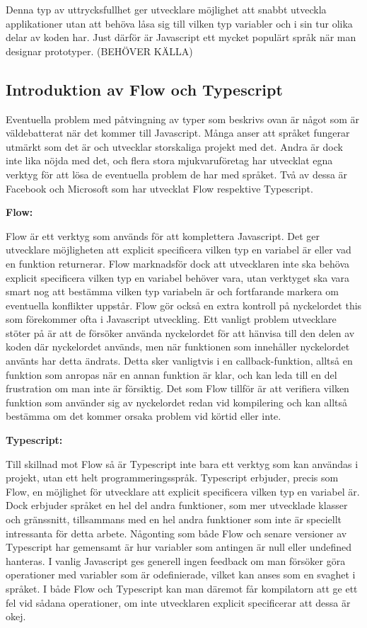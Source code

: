 Denna typ av uttrycksfullhet ger utvecklare möjlighet att snabbt utveckla applikationer utan att behöva låsa sig till vilken typ variabler och i sin tur olika delar av koden har. Just därför är Javascript ett mycket populärt språk när man designar prototyper. (BEHÖVER KÄLLA)


\subsection{Introduktion av Flow och Typescript}

Eventuella problem med påtvingning av typer som beskrivs ovan är något som är väldebatterat när det kommer till Javascript. Många anser att språket fungerar utmärkt som det är och utvecklar storskaliga projekt med det. Andra är dock inte lika nöjda med det, och flera stora mjukvaruföretag har utvecklat egna verktyg för att lösa de eventuella problem de har med språket. Två av dessa är Facebook och Microsoft som har utvecklat Flow respektive Typescript.

\textbf{Flow:}

Flow är ett verktyg som används för att komplettera Javascript. Det ger utvecklare möjligheten att explicit specificera vilken typ en variabel är eller vad en funktion returnerar. Flow marknadsför dock att utvecklaren inte ska behöva explicit specificera vilken typ en variabel behöver vara, utan verktyget ska vara smart nog att bestämma vilken typ variabeln är och fortfarande markera om eventuella konflikter uppstår. Flow gör också en extra kontroll på nyckelordet this som förekommer ofta i Javascript utveckling. Ett vanligt problem utvecklare stöter på är att de försöker använda nyckelordet för att hänvisa till den delen av koden där nyckelordet används, men när funktionen som innehåller nyckelordet använts har detta ändrats. Detta sker vanligtvis i en callback-funktion, alltså en funktion som anropas när en annan funktion är klar, och kan leda till en del frustration om man inte är försiktig. Det som Flow tillför är att verifiera vilken funktion som använder sig av nyckelordet redan vid kompilering och kan alltså bestämma om det kommer orsaka problem vid körtid eller inte. 

\textbf{Typescript:}

Till skillnad mot Flow så är Typescript inte bara ett verktyg som kan användas i projekt, utan ett helt programmeringsspråk. Typescript erbjuder, precis som Flow, en möjlighet för utvecklare att explicit specificera vilken typ en variabel är. Dock erbjuder språket en hel del andra funktioner, som mer utvecklade klasser och gränssnitt, tillsammans med en hel andra funktioner som inte är speciellt intressanta för detta arbete.
Någonting som både Flow och senare versioner av Typescript har gemensamt är hur variabler som antingen är null eller undefined hanteras. I vanlig Javascript ges generell ingen feedback om man försöker göra operationer med variabler som är odefinierade, vilket kan anses som en svaghet i språket. I både Flow och Typescript kan man däremot får kompilatorn att ge ett fel vid sådana operationer, om inte utvecklaren explicit specificerar att dessa är okej.

